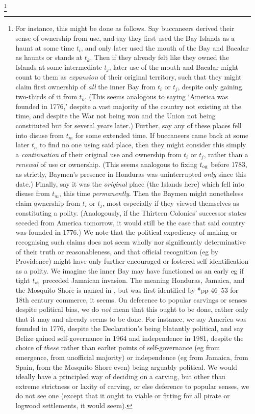 		\footnote{For instance, this might be done as follows. Say buccaneers derived their sense of ownership from use, and say they first used the Bay Islands as a haunt at some time \(t_i\), and only later used the mouth of the Bay and Bacalar as haunts or stands at \(t_k\). Then if they already felt like they owned the Islands at some intermediate \(t_j\), later use of the mouth and Bacalar might count to them as \emph{expansion} of their original territory, such that they might claim first ownership of \emph{all} the inner Bay from \(t_i\) or \(t_j\), despite only gaining two-thirds of it from \(t_k\). (This seems analogous to saying `America was founded in 1776,' despite a vast majority of the country not existing at the time, and despite the War not being won and the Union not being constituted but for several years later.) Further, say any of these places fell into disuse from \(t_m\) for some extended time. If buccaneers came back at some later \(t_n\) to find no one using said place, then they might consider this simply a \emph{continuation} of their original use and ownership from \(t_i\) or \(t_j\), rather than a \emph{renewal} of use or ownership. (This seems analogous to fixing \(t_{\operatorname{og}}\) before 1783, as strictly, Baymen's presence in Honduras was uninterrupted \emph{only} since this date.) Finally, say it was the \emph{original} place (the Islands here) which fell into disuse from \(t_m\), this time \emph{permanently}. Then the Baymen might nonetheless claim ownership from \(t_i\) or \(t_j\), most especially if they viewed themselves as constituting a polity. (Analogously, if the Thirteen Colonies' successor states seceded from America tomorrow, it would still be the case that said country was founded in 1776.) We note that the political expediency of making or recognising such claims does not seem wholly nor significantly determinative of their truth or reasonableness, and that official recognition (eg by Providence) might have only further encouraged or fostered self-identification as a polity. We imagine the inner Bay may have functioned as an early  eg if tight \(t_{\operatorname{ct}}\) preceded Jamaican invasion. The  meaning Honduras, Jamaica, and the Mosquito Shore is named in , but was first identified by \cite{nay89}*{pp 46--53} for 18th century commerce, it seems. On deference to popular carvings or senses despite political bias, we do \emph{not} mean that this ought to be done, rather only that it may and already seems to be done. For instance, we say America was founded in 1776, despite the Declaration's being blatantly political, and say Belize gained self-governance in 1964 and independence in 1981, despite the choice of \emph{these} rather than earlier points of self-governance (eg from emergence, from unofficial majority) or independence (eg from Jamaica, from Spain, from the Mosquito Shore even) being arguably political. We would ideally have a principled way of deciding on a carving, but other than extreme strictness or laxity of carving, or else deference to popular senses, we do not see one (except that it ought to viable or fitting for all pirate or logwood settlements, it would seem).} %
